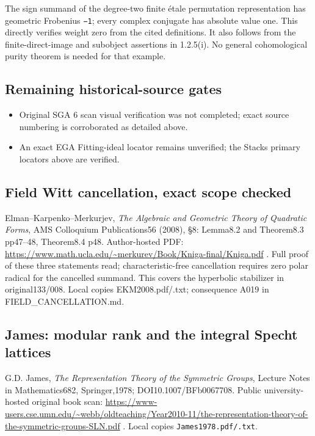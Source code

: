 \documentclass[
  10pt,
]{article}
\providecommand{\tightlist}{%
  \setlength{\itemsep}{0pt}\setlength{\parskip}{0pt}}
\providecommand{\tightlist}{\setlength{\itemsep}{0pt}\setlength{\parskip}{0pt}}
\begin{document}
The sign summand of the degree-two finite étale permutation
representation has geometric Frobenius \texttt{\small −1}; every complex
conjugate has absolute value one. This directly verifies weight zero
from the cited definitions. It also follows from the finite-direct-image
and subobject assertions in 1.2.5(i). No general cohomological purity
theorem is needed for that example.

\subsection{Remaining historical-source
gates}\label{remaining-historical-source-gates}

\begin{itemize}
\tightlist
\item
  Original SGA 6 scan visual verification was not completed; exact
  source numbering is corroborated as detailed above.
\item
  An exact EGA Fitting-ideal locator remains unverified; the Stacks
  primary locators above are verified.
\end{itemize}

\subsection{Field Witt cancellation, exact scope
checked}\label{field-witt-cancellation-exact-scope-checked}

Elman--Karpenko--Merkurjev, \emph{The Algebraic and Geometric Theory of
Quadratic Forms}, AMS Colloquium Publications56 (2008), §8: Lemma8.2 and
Theorem8.3 pp47--48, Theorem8.4 p48. Author-hosted PDF:
\url{https://www.math.ucla.edu/~merkurev/Book/Kniga-final/Kniga.pdf} .
Full proof of these three statements read; characteristic-free
cancellation requires zero polar radical for the cancelled summand. This
covers the hyperbolic stabilizer in original133/008. Local copies
EKM2008.pdf/.txt; consequence A019 in FIELD\_CANCELLATION.md.

\subsection{James: modular rank and the integral Specht
lattices}\label{james-modular-rank-and-the-integral-specht-lattices}

G.D. James, \emph{The Representation Theory of the Symmetric Groups},
Lecture Notes in Mathematics682, Springer,1978; DOI10.1007/BFb0067708.
Public university-hosted original book scan:
\url{https://www-users.cse.umn.edu/~webb/oldteaching/Year2010-11/the-representation-theory-of-the-symmetric-groups-SLN.pdf}
. Local copies \texttt{\small James1978.pdf/\allowbreak{}.txt}.
\end{document}
